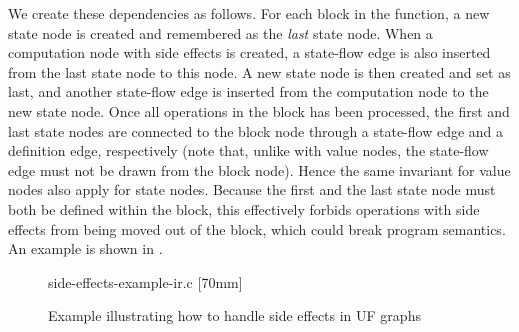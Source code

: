 We create these dependencies as follows.
%
For each \gls{block} in the \gls{function}, a new \gls{state node} is created
and remembered as the \emph{last} \gls{state node}.
%
When a \gls{computation node} with side effects is created, a state-flow
\gls{edge} is also inserted from the last \gls{state node} to this \gls{node}.
%
A new \gls{state node} is then created and set as last, and another state-flow
\gls{edge} is inserted from the \gls{computation node} to the new \gls{state
  node}.
%
Once all \glspl{operation} in the \gls{block} has been processed, the first and
last \glspl{state node} are connected to the \gls{block node} through a
state-flow \gls{edge} and a \gls{definition edge}, respectively (note that,
unlike with \glspl{value node}, the state-flow \gls{edge} must not be drawn from
the  \gls{block node}).
%
Hence the same invariant for \glspl{value node} also apply for \glspl{state
  node}.
%
Because the first and the last \gls{state node} must both be defined within the
\gls{block}, this effectively forbids \glspl{operation} with side effects from
being moved out of the \gls{block}, which could break \gls{program} semantics.
%
An example is shown in .
%
\begin{filecontents*}{side-effects-example-ir.c}
block:
  $\ldots$
  $\irAssign{\irVar{t}[1]}{\irLoad{p}}$
  $\irAssign{\irVar{t}[2]}{\irCall{foo, \irVar{t}[1]}}$
  $\irStore{\irVar{q}}{\irVar{t}[2]}$
}
\end{filecontents*}
%
\begin{figure}
  \centering%
  \mbox{}%
  \hfill%
                {%
                                  {side-effects-example-ir.c}%
                }%
  \hfill%
                [70mm]%
                {%
                }%
  \hfill%
  \mbox{}

  \caption{Example illustrating how to handle side effects in UF graphs}%
\end{figure}



